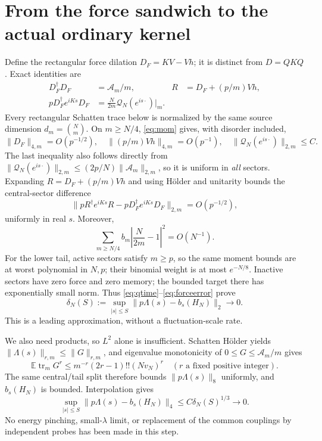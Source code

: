 \documentclass[11pt,a4paper]{article}
\newcommand{\EE}{\mathbb E}
\newcommand{\tr}{\operatorname{tr}}
\begin{document}
\section{From the force sandwich to the actual ordinary kernel}
Define the rectangular force dilation $D_F=KV-Vh$; it is distinct
from $D=QKQ$. Exact identities are
\begin{align}
 D_F^\dagger D_F&=\mathcal A_m/m,&
 R&=D_F+(p/m)Vh,\\
 pD_F^\dagger e^{iKs}D_F
 &=\frac{N}{2m}\mathcal Q_N(e^{is\cdot})\big|_m.\label{eq:dilation}
\end{align}
Every rectangular Schatten trace below is normalized by the same
source dimension $d_m=\binom Nm$. On $m\ge N/4$,
\eqref{eq:mom} gives, with disorder included,
\begin{equation}
 \|D_F\|_{4,m}=O(p^{-1/2}),\quad
 \|(p/m)Vh\|_{4,m}=O(p^{-1}),\quad
 \|\mathcal Q_N(e^{is\cdot})\|_{2,m}\le C.
\end{equation}
The last inequality also follows directly from
$\|\mathcal Q_N(e^{is\cdot})\|_{2,m}\le (2p/N)\|\mathcal A_m\|_{2,m}$,
so it is uniform in \emph{all} sectors. Expanding $R=D_F+(p/m)Vh$
and using H\"older and unitarity bounds the central-sector difference
\begin{equation}
 \|pR^\dagger e^{iKs}R-pD_F^\dagger e^{iKs}D_F\|_{2,m}
 =O(p^{-1/2}),\label{eq:forceerror}
\end{equation}
uniformly in real $s$. Moreover,
\begin{equation}
 \sum_{m\ge N/4}b_m\left|\frac{N}{2m}-1\right|^2=O(N^{-1}).
\end{equation}
For the lower tail, active sectors satisfy $m\ge p$, so the same
moment bounds are at worst polynomial in $N,p$; their binomial
weight is at most $e^{-N/8}$. Inactive sectors have zero force
and zero memory; the bounded target there has exponentially small
norm. Thus \eqref{eq:qtime}--\eqref{eq:forceerror} prove
\begin{equation}
 \delta_N(S):=\sup_{|s|\le S}
 \|p\Lambda(s)-b_s(H_N)\|_2\longrightarrow0.\label{eq:lambdalimit}
\end{equation}
This is a leading approximation, without a fluctuation-scale rate.

We also need products, so $L^2$ alone is insufficient.
Schatten H\"older yields $\|\Lambda(s)\|_{r,m}\le\|G\|_{r,m}$,
and eigenvalue monotonicity of $0\le G\le\mathcal A_m/m$ gives
\begin{equation}
 \EE\tr_m G^r\le m^{-r}(2r-1)!!(Nv_N)^r
 \quad(r\text{ a fixed positive integer}).
\end{equation}
The same central/tail split therefore bounds $\|p\Lambda(s)\|_8$
uniformly, and $b_s(H_N)$ is bounded. Interpolation gives
\begin{equation}
 \sup_{|s|\le S}\|p\Lambda(s)-b_s(H_N)\|_4
 \le C\delta_N(S)^{1/3}\longrightarrow0.\label{eq:l4}
\end{equation}
No energy pinching, small-$\lambda$ limit, or replacement of the
common couplings by independent probes has been made in this step.
\end{document}
